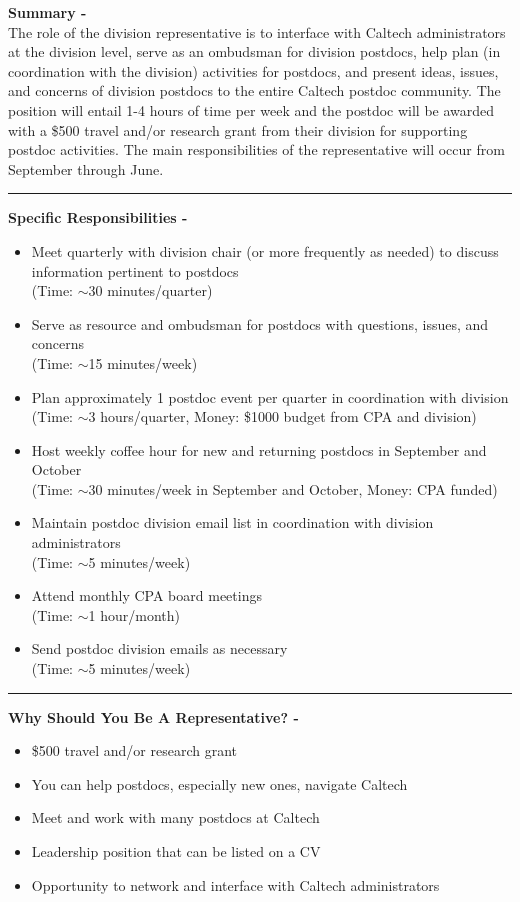 \documentclass[12pt]{article}
\begin{document}
\pagestyle{fancy}
\rhead{{\thepage/\totalpages{}}}
\cfoot{}
\vspace*{-0.35in}

\textbf{Summary -}\\
The role of the division representative is to interface with Caltech administrators at the division level, serve as an ombudsman for division postdocs, help plan (in coordination with the division) activities for postdocs, and present ideas, issues, and concerns of division postdocs to the entire Caltech postdoc community.
The position will entail 1-4 hours of time per week and the postdoc will be awarded with a \$500 travel and/or research grant from their division for supporting postdoc activities.
The main responsibilities of the representative will occur from September through June.

\rule{\textwidth}{0.5pt}

\textbf{Specific Responsibilities -}
\begin{itemize}
 \item Meet quarterly with division chair (or more frequently as needed) to discuss information pertinent to postdocs\\ 
 (Time: $\sim$30 minutes/quarter)
 \item Serve as resource and ombudsman for postdocs with questions, issues, and concerns\\
 (Time: $\sim$15 minutes/week)
 \item Plan approximately 1 postdoc event per quarter in coordination with division\\
 (Time: $\sim$3 hours/quarter, Money: \$1000 budget from CPA and division)
 \item Host weekly coffee hour for new and returning postdocs in September and October\\
 (Time: $\sim$30 minutes/week in September and October, Money: CPA funded)
 \item Maintain postdoc division email list in coordination with division administrators\\
 (Time: $\sim$5 minutes/week)
 \item Attend monthly CPA board meetings\\
 (Time: $\sim$1 hour/month)
 \item Send postdoc division emails as necessary\\
 (Time: $\sim$5 minutes/week)
\end{itemize}

\rule{\textwidth}{0.5pt}

\textbf{Why Should You Be A Representative? -}
\begin{itemize}
 \item \$500 travel and/or research grant
 \item You can help postdocs, especially new ones, navigate Caltech
 \item Meet and work with many postdocs at Caltech
 \item Leadership position that can be listed on a CV 
 \item Opportunity to network and interface with Caltech administrators
\end{itemize}
\end{document}
